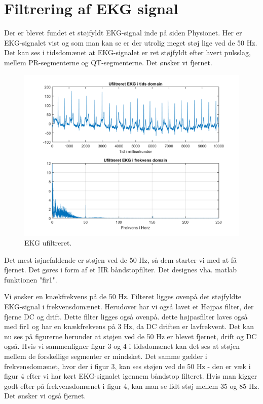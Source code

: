 \documentclass[12pt, letterpaper]{article}
\begin{document}
\section{Filtrering af EKG signal}

Der er blevet fundet et støjfyldt EKG-signal inde på siden Physionet. Her er EKG-signalet vist og som man kan se er der utrolig meget støj lige ved de 50 Hz. Det kan ses i tidsdomænet at EKG-signalet er ret støjfyldt efter hvert pulsslag, mellem PR-segmenterne og QT-segmenterne. Det ønsker vi fjernet. 

\begin{figure}[H]
           \includegraphics[width=\linewidth]{billeder/EKGufiltreret}	   							\caption{EKG ufiltreret.}
\end{figure}

Det mest iøjnefaldende er støjen ved de 50 Hz, så dem starter vi med at få fjernet. Det gøres i form af et IIR båndstopfilter. Det designes vha. matlab funktionen "fir1". 


Vi ønsker en knækfrekvens på de 50 Hz. 
Filteret ligges ovenpå det støjfyldte EKG-signal i frekvensdomænet. 
Herudover har vi også lavet et Højpas filter, der fjerne DC og drift. Dette filter ligges også ovenpå. 
dette højpasfilter laves også med fir1 og har en knækfrekvens på 3 Hz, da DC driften er lavfrekvent. 
Det kan nu ses på figurerne herunder at støjen ved de 50 Hz er blevet fjernet, drift og DC også. Hvis vi sammenligner figur 3 og 4 i tidsdomænet kan det ses at støjen mellem de forskellige segmenter er mindsket. Det samme gælder i frekvensdomænet, hvor der i figur 3, kan ses støjen ved de 50 Hz - den er væk i figur 4 efter vi har kørt EKG-signalet igennem båndstop filteret.  
Hvis man kigger godt efter på frekvensdomænet i figur 4, kan man se lidt støj mellem 35 og 85 Hz. Det ønsker vi også fjernet. 
\end{document}
